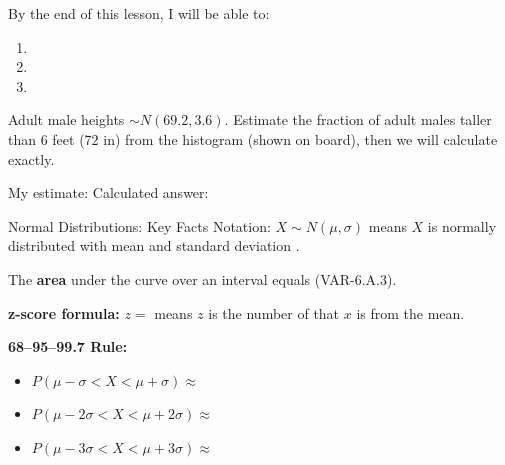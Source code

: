 \documentclass[10pt]{article}
\begin{document}
\namedateperiod

\vspace{0.15in}

\begin{objectivebox}
By the end of this lesson, I will be able to:
\begin{enumerate}
  \item \writeline
  \item \writeline
  \item \writeline
\end{enumerate}
\end{objectivebox}

\vspace{0.1in}

\begin{vocabbox}
\end{vocabbox}

\vspace{0.1in}

\begin{hookbox}
Adult male heights $\sim N(69.2, 3.6)$. Estimate the fraction of adult males taller
than 6 feet (72 in) from the histogram (shown on board), then we will calculate exactly.

My estimate: \blank{3cm} \qquad Calculated answer: \blank{3cm}
\end{hookbox}

\vspace{0.1in}

\begin{notesbox}{Normal Distributions: Key Facts}
Notation: $X \sim N(\mu, \sigma)$ means $X$ is normally distributed with mean
\blank{3cm} and standard deviation \blank{3cm}.

The \textbf{area} under the curve over an interval equals \blank{6cm} (VAR-6.A.3).

\textbf{z-score formula:} $z = $ \blank{4cm} \hfill
means $z$ is the number of \blank{4cm} that $x$ is from the mean.

\textbf{68--95--99.7 Rule:}
\begin{itemize}
  \item $P(\mu - \sigma < X < \mu + \sigma) \approx $ \blank{2cm}
  \item $P(\mu - 2\sigma < X < \mu + 2\sigma) \approx $ \blank{2cm}
  \item $P(\mu - 3\sigma < X < \mu + 3\sigma) \approx $ \blank{2cm}
\end{itemize}
\end{notesbox}
\end{document}
